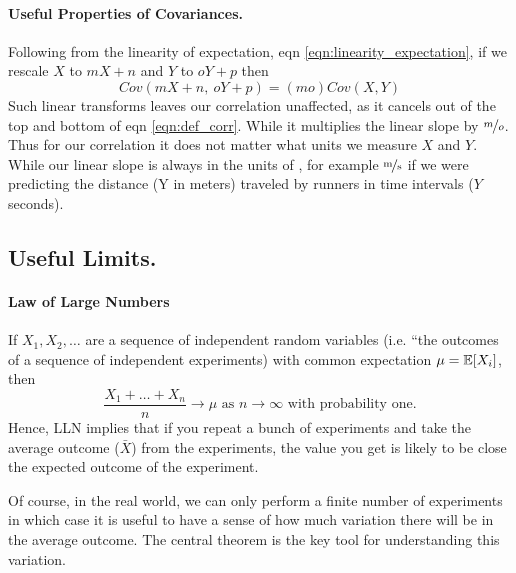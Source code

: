 
\paragraph{Useful Properties of Covariances.}
Following from the linearity of expectation, eqn
\eqref{eqn:linearity_expectation}, if we rescale $X$ to $mX+n$ and
$Y$ to $oY+p$ then
\begin{equation}
Cov(mX+n,~oY+p) = (mo) Cov(X,Y) 
\end{equation}
Such linear transforms leaves our correlation unaffected, as it
cancels out of the top and bottom of eqn \eqref{eqn:def_corr}. While
it multiplies the linear slope by $\nicefrac{m}{o}$. Thus
for our correlation it does not matter what units we measure $X$ and
$Y$. While our linear slope is always in the units of
, for example
$\nicefrac{\textrm{m}}{\textrm{s}}$ if we were predicting the
distance (Y in meters) traveled by runners in time intervals ($Y$ seconds).

\subsection*{Useful Limits.} \label{section:useful_limits}
\paragraph{Law of Large Numbers} If $X_1,X_2,\dots$ are a sequence of independent random variables (i.e. ``the outcomes of a sequence of independent experiments) with common expectation $\mu= \mathbb{E}[X_i]$, then 
\begin{equation}
\frac{X_1+\dots +X_n}{n} \to \mu \mbox{ as }n\to \infty \mbox{ with
  probability one.}
\end{equation}
Hence, LLN implies that if you repeat a bunch of experiments and take
the average outcome ($\bar{X}$) from the experiments, the value you get is likely to be close the expected outcome of the experiment. 

Of course, in the real world, we can only perform a finite number of experiments in which case it is useful to have a sense of how much variation there will be in the average outcome. The central theorem is the key tool for understanding this variation. 

